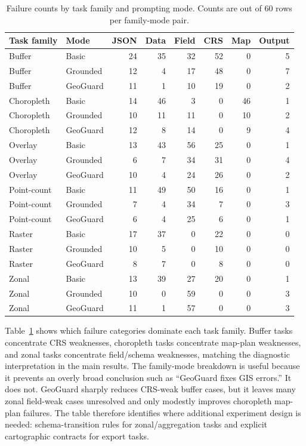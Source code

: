 \documentclass[]{interact}
\begin{document}
\begin{table}[htbp]
\centering
\caption{Failure counts by task family and prompting mode. Counts are out of 60 rows per family-mode pair.}
\label{tab:appendix-failure-family}
\small
\setlength{\tabcolsep}{3pt}
\begin{tabular}{llrrrrrr}
\toprule
Task family & Mode & JSON & Data & Field & CRS & Map & Output \\
\midrule
Buffer & Basic & 24 & 35 & 32 & 52 & 0 & 5 \\
Buffer & Grounded & 12 & 4 & 17 & 48 & 0 & 7 \\
Buffer & GeoGuard & 11 & 1 & 10 & 19 & 0 & 2 \\
Choropleth & Basic & 14 & 46 & 3 & 0 & 46 & 1 \\
Choropleth & Grounded & 10 & 11 & 11 & 0 & 10 & 2 \\
Choropleth & GeoGuard & 12 & 8 & 14 & 0 & 9 & 4 \\
Overlay & Basic & 13 & 43 & 56 & 25 & 0 & 1 \\
Overlay & Grounded & 6 & 7 & 34 & 31 & 0 & 4 \\
Overlay & GeoGuard & 10 & 4 & 24 & 26 & 0 & 2 \\
Point-count & Basic & 11 & 49 & 50 & 16 & 0 & 1 \\
Point-count & Grounded & 7 & 4 & 34 & 7 & 0 & 3 \\
Point-count & GeoGuard & 6 & 4 & 25 & 6 & 0 & 1 \\
Raster & Basic & 17 & 37 & 0 & 22 & 0 & 0 \\
Raster & Grounded & 10 & 5 & 0 & 10 & 0 & 0 \\
Raster & GeoGuard & 8 & 7 & 0 & 8 & 0 & 0 \\
Zonal & Basic & 13 & 39 & 27 & 20 & 0 & 1 \\
Zonal & Grounded & 10 & 0 & 59 & 0 & 0 & 3 \\
Zonal & GeoGuard & 11 & 1 & 57 & 0 & 0 & 3 \\
\bottomrule
\end{tabular}
\end{table}

Table~\ref{tab:appendix-failure-family} shows which failure categories dominate each task family. Buffer tasks concentrate CRS weaknesses, choropleth tasks concentrate map-plan weaknesses, and zonal tasks concentrate field/schema weaknesses, matching the diagnostic interpretation in the main results. The family-mode breakdown is useful because it prevents an overly broad conclusion such as ``GeoGuard fixes GIS errors.'' It does not. GeoGuard sharply reduces CRS-weak buffer cases, but it leaves many zonal field-weak cases unresolved and only modestly improves choropleth map-plan failures. The table therefore identifies where additional experiment design is needed: schema-transition rules for zonal/aggregation tasks and explicit cartographic contracts for export tasks.
\end{document}
